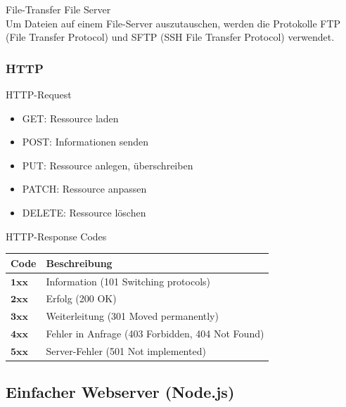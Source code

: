 \begin{definition}
    {File-Transfer} File Server\\
    Um Dateien auf einem File-Server auszutauschen, werden die Protokolle FTP (File Transfer Protocol) und SFTP (SSH File Transfer Protocol) verwendet.
\end{definition}

\subsubsection{HTTP}

\begin{concept}
    {HTTP-Request}
    \begin{itemize}
        \item GET: Ressource laden
        \item POST: Informationen senden
        \item PUT: Ressource anlegen, überschreiben
        \item PATCH: Ressource anpassen
        \item DELETE: Ressource löschen
    \end{itemize}
\end{concept}

\begin{concept}{HTTP-Response Codes}
    \begin{center}
    \begin{tabular}{|l|l|}
    \hline
    Code & Beschreibung \\
    \hline
    $\mathbf{1 x x}$ & Information (101 Switching protocols) \\
    \hline
    $\mathbf{2 x x}$ & Erfolg (200 OK) \\
    \hline
    $\mathbf{3 x x}$ & Weiterleitung (301 Moved permanently) \\
    \hline
    $\mathbf{4 x x}$ & Fehler in Anfrage (403 Forbidden, 404 Not Found) \\
    \hline
    $\mathbf{5 x x}$ & Server-Fehler (501 Not implemented) \\
    \hline
    \end{tabular}
    \end{center}
\end{concept}

\subsection{Einfacher Webserver (Node.js)}

